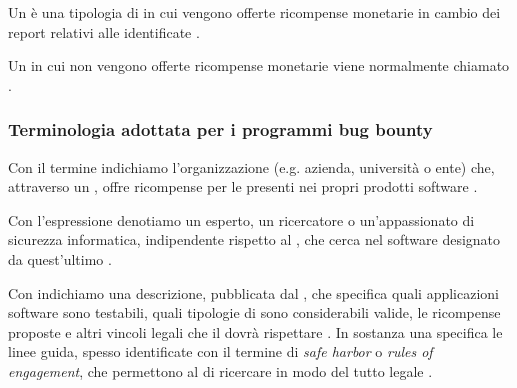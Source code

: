 \begin{definizione}
Un \BBP è una tipologia di \CVD in cui vengono offerte ricompense monetarie in cambio dei report relativi alle \vulnerability identificate \cite{walshe2023bountythesis2, walshe2022cvdpaper, akgul2020bughunters}.
\end{definizione}

\begin{definizione}
Un \CVD in cui non vengono offerte ricompense monetarie viene normalmente chiamato \VDP \cite{walshe2023bountythesis2, walshe2022cvdpaper, akgul2020bughunters}.
\end{definizione}


\subsubsection{Terminologia adottata per i programmi bug bounty}

\begin{definizione}
Con il termine \BI indichiamo l'organizzazione (e.g. azienda, università o ente) che, attraverso un \BBP, offre ricompense per le \vulnerability presenti nei propri prodotti software \cite{canidio2021verioss}.
\end{definizione}

\begin{definizione}
Con l'espressione \BH denotiamo un esperto, un ricercatore o un'appassionato di sicurezza informatica, indipendente rispetto al \BI, che cerca \vulnerability nel software designato da quest'ultimo \cite{canidio2021verioss}. 
\end{definizione}


\begin{definizione}[\BugBounty]
Con \bugbounty indichiamo una descrizione, pubblicata dal \BI, che specifica quali applicazioni software sono testabili, quali tipologie di \vulnerability sono considerabili valide, le ricompense proposte e altri vincoli legali che il \BH dovrà rispettare \cite{hoffman2021bountychain, hoffman2020bountychain}. In sostanza una \bugbounty specifica le linee guida, spesso identificate con il termine di \emph{safe harbor} o \emph{rules of engagement}, che permettono al \BH di ricercare \vulnerability in modo del tutto legale \cite{walshe2022cvdpaper, walshe2020bountypaper, walshe2023bountythesis3}.
\end{definizione}

